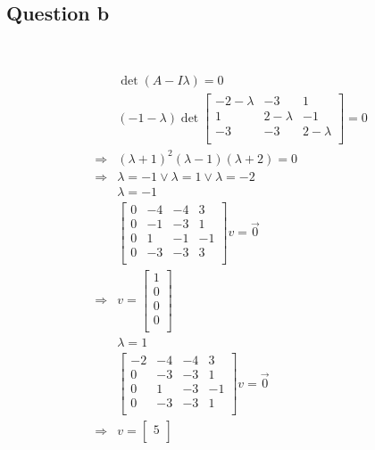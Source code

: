 \documentclass{article}
\begin{document}
\subsection{Question b}

~

\begin{equation*}
    \begin{split}
        &\det(A-I\lambda)=0\\
        &(-1-\lambda)\det\begin{bmatrix}
            -2-\lambda&-3&1\\
            1&2-\lambda&-1\\
            -3&-3&2-\lambda\\
        \end{bmatrix}=0\\
        \Rightarrow&(\lambda+1)^2(\lambda-1)(\lambda+2)=0\\
        \Rightarrow&\lambda=-1\lor\lambda=1\lor\lambda=-2\\
        &\lambda=-1\\
        &\begin{bmatrix}
            0&-4&-4&3\\
            0&-1&-3&1\\
            0&1&-1&-1\\
            0&-3&-3&3\\
        \end{bmatrix}v=\overrightarrow{0}\\
        \Rightarrow&v=\begin{bmatrix}
            1\\
            0\\
            0\\
            0\\
        \end{bmatrix}\\
        &\lambda=1\\
        &\begin{bmatrix}
            -2&-4&-4&3\\
            0&-3&-3&1\\
            0&1&-3&-1\\
            0&-3&-3&1\\
        \end{bmatrix}v=\overrightarrow{0}\\
        \Rightarrow&v=\begin{bmatrix}
            5\\

\end{bmatrix}
\end{split}
\end{equation*}
\end{document}
